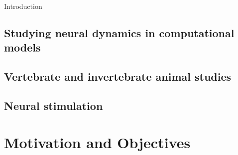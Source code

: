 \documentclass[aspectratio=43]{beamer}
\begin{document}
\begin{frame}{Introduction}
    \subsection{Studying neural dynamics in computational models}
    \subsection{Vertebrate and invertebrate animal studies}
    \subsection{Neural stimulation}
    
	\end{frame}


\section{Motivation and Objectives}
\end{document}
